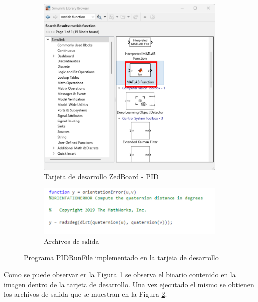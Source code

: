 \begin{figure}[htbp]
    \centering
    \begin{subfigure}[b]{0.35\textwidth}
        \centering
        \includegraphics[width=\textwidth]{fig/Capitulo5/Caso_de_estudio_IMU/Generador_de_salidas/libreria_bloque_de_funcion.pdf}
        \caption{Tarjeta de desarrollo ZedBoard - PID}
        \label{fig:PID_zedboard}
    \end{subfigure}
    \hfill
    \begin{subfigure}[b]{0.45\textwidth}
        \centering
        \includegraphics[width=\textwidth]{fig/Capitulo5/Caso_de_estudio_IMU/Generador_de_salidas/configuracion_codigo.pdf}
        \caption{Archivos de salida}
        \label{fig:out_files_PID}
    \end{subfigure}
    \caption{Programa PIDRunFile implementado en la tarjeta de desarrollo}
    \label{fig:PID_ZEDBOARD}
\end{figure}


Como se puede observar en la Figura \ref{fig:PID_zedboard} se observa el binario contenido en la imagen dentro de la tarjeta de desarrollo. Una vez ejecutado el mismo se obtienen los archivos de salida que se muestran en la Figura \ref{fig:out_files_PID}. 

